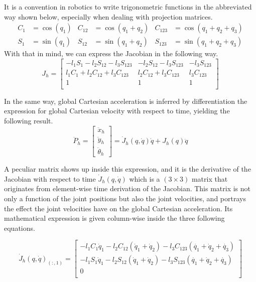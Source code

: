 \documentclass[12pt, a4paper]{article}
\begin{document}
\noindent It is a convention in robotics to write trigonometric functions in the abbreviated way shown below, especially when dealing with projection matrices.
\begin{align*}
    C_1 &= \cos(q_1) & C_{12} &= \cos(q_1 + q_2) & C_{123} &= \cos(q_1 + q_2 + q_3)\\
    S_1 &= \sin(q_1) & S_{12} &= \sin(q_1 + q_2) & S_{123} &= \sin(q_1 + q_2 + q_3)
\end{align*}
\noindent With that in mind, we can express the Jacobian in the following way.
\begin{equation}
    J_h = 
    \begin{bmatrix}
    -l_1   S_{1} - l_2   S_{12} - l_3   S_{123} & - l_2   S_{12} - l_3   S_{123} & - l_3   S_{123}\\
    l_1   C_{1} + l_2   C_{12} + l_3   C_{123} & l_2   C_{12} + l_3   C_{123} & l_3   C_{123}\\
    1 & 1 & 1\\
    \end{bmatrix}
\end{equation}

\noindent In the same way, global Cartesian acceleration is inferred by differentiation the expression for global Cartesian velocity with respect to time, yielding the following result.
\begin{equation}
    \ddot{P}_h = 
    \begin{bmatrix}
    \ddot{x}_h\\
    \ddot{y}_h\\
    \ddot{\theta}_h
    \end{bmatrix}
    =
    \dot{J}_h(q, \dot{q})\dot{q} + J_h(q) \ddot{q}
\end{equation}

\noindent A peculiar matrix shows up inside this expression, and it is the derivative of the Jacobian with respect to time $\dot{J}_h(q, \dot{q})$ which is a $(3\times3)$ matrix that originates from element-wise time derivation of the Jacobian. This matrix is not only a function of the joint positions but also the joint velocities, and portrays the effect the joint velocities have on the global Cartesian acceleration. Its mathematical expression is given column-wise inside the three following equations.

\begin{equation}
    \dot{J}_h(q, \dot{q})_{(:, 1)} = 
    \begin{bmatrix}
    -l_1   C_{1} \dot{q}_1 - l_2   C_{12} (\dot{q}_1 + \dot{q}_2) - l_3   C_{123} (\dot{q_1} + \dot{q}_2 + \dot{q_3}) \\
    - l_1   S_{1} \dot{q}_1 - l_2   S_{12} (\dot{q}_1 + \dot{q}_2)  - l_3   S_{123} (\dot{q_1} + \dot{q}_2 + \dot{q_3})\\
    0\\
    \end{bmatrix}
\end{equation}
\end{document}
